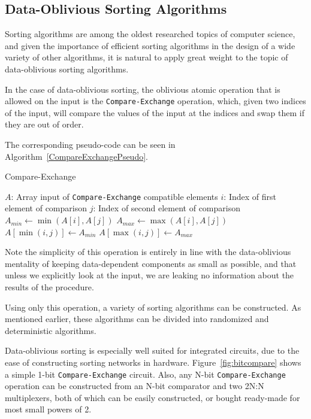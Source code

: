 \subsection{Data-Oblivious Sorting Algorithms}

Sorting algorithms are among the oldest researched topics of computer science, and given the importance of efficient sorting algorithms in the design of a wide variety of other algorithms, it is natural to apply great weight to the topic of data-oblivious sorting algorithms.

In the case of data-oblivious sorting, the oblivious atomic operation that is allowed on the input is the \texttt{Compare-Exchange} operation, which, given two indices of the input, will compare the values of the input at the indices and swap them if they are out of order.

The corresponding pseudo-code can be seen in Algorithm~\ref{CompareExchangePseudo}.

\begin{algorithm}
\caption{Compare-Exchange}\label{CompareExchangePseudo}
\begin{algorithmic}[1]
	\Statex $A$: Array input of \texttt{Compare-Exchange} compatible elements
	\Statex $i$: Index of first element of comparison
	\Statex $j$: Index of second element of comparison
\State $A_{min} \gets \min(A[i], A[j])$
\State $A_{max} \gets \max(A[i], A[j])$
\State $A[\min(i,j)] \gets A_{min}$
\State $A[\max(i,j)] \gets A_{max}$
\EndProcedure
\end{algorithmic}
\end{algorithm}

Note the simplicity of this operation is entirely in line with the data-oblivious mentality of keeping data-dependent components as small as possible, and that unless we explicitly look at the input, we are leaking no information about the results of the procedure.

Using only this operation, a variety of sorting algorithms can be constructed. As mentioned earlier, these algorithms can be divided into randomized and deterministic algorithms.

Data-oblivious sorting is especially well suited for integrated circuits, due to the ease of constructing sorting networks in hardware.
Figure~\ref{fig:bitcompare} shows a simple 1-bit \texttt{Compare-Exchange} circuit. Also, any N-bit \texttt{Compare-Exchange} operation can be constructed from an N-bit comparator and two 2N:N multiplexers, both of which can be easily constructed, or bought ready-made for most small powers of 2.

